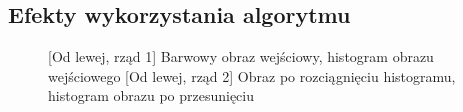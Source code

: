 \documentclass[a4paper,12pt, titlepage]{report}
\begin{document}
\subsection*{Efekty wykorzystania algorytmu}
\begin{figure}[h]
    \centering
    \qquad
    \caption{[Od lewej, rząd 1] Barwowy obraz wejściowy, histogram obrazu wejściowego [Od lewej, rząd 2] Obraz po rozciągnięciu histogramu, histogram obrazu po przesunięciu}%
    \label{fig:geo_after_grey1}%
\end{figure}
\end{document}
